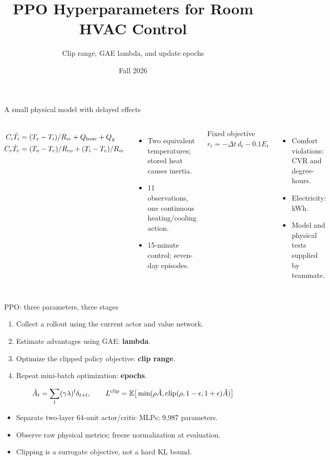 \documentclass[aspectratio=169,10pt]{beamer}
\title{PPO Hyperparameters for Room HVAC Control}
\subtitle{Clip range, GAE lambda, and update epochs}
\author{\TeamAuthors}
\institute{AIAA 5034 --- Topic 16}
\date{Fall 2026}
\begin{document}
\begin{frame}
\titlepage
\end{frame}

\begin{frame}{A small physical model with delayed effects}
\begin{columns}
\begin{align*}
C_i\dot T_i&=(T_e-T_i)/R_{ie}+Q_{\rm hvac}+Q_g\\
C_e\dot T_e&=(T_o-T_e)/R_{eo}+(T_i-T_e)/R_{ie}
\end{align*}
\begin{itemize}
\item Two equivalent temperatures; stored heat causes inertia.
\item 11 observations, one continuous heating/cooling action.
\item 15-minute control; seven-day episodes.
\end{itemize}
\begin{block}{Fixed objective}
$r_t=-\Delta t\,d_t-0.1E_t$
\end{block}
\begin{itemize}
\item Comfort violations: CVR and degree-hours.
\item Electricity: kWh.
\item Model and physical tests supplied by teammate.
\end{itemize}
\end{columns}
\end{frame}

\begin{frame}{PPO: three parameters, three stages}
\begin{enumerate}
\item Collect a rollout using the current actor and value network.
\item Estimate advantages using GAE: \textbf{lambda}.
\item Optimize the clipped policy objective: \textbf{clip range}.
\item Repeat mini-batch optimization: \textbf{epochs}.
\end{enumerate}
\vspace{2mm}
\[
\hat A_t=\sum_l(\gamma\lambda)^l\delta_{t+l},\qquad
L^{\rm clip}=\mathbb E\big[\min(\rho\hat A,\mathrm{clip}(\rho,1-\epsilon,1+\epsilon)\hat A)\big]
\]
\begin{itemize}
\item Separate two-layer 64-unit actor/critic MLPs; 9,987 parameters.
\item Observe raw physical metrics; freeze normalization at evaluation.
\item Clipping is a surrogate objective, not a hard KL bound.
\end{itemize}
\end{frame}
\end{document}
